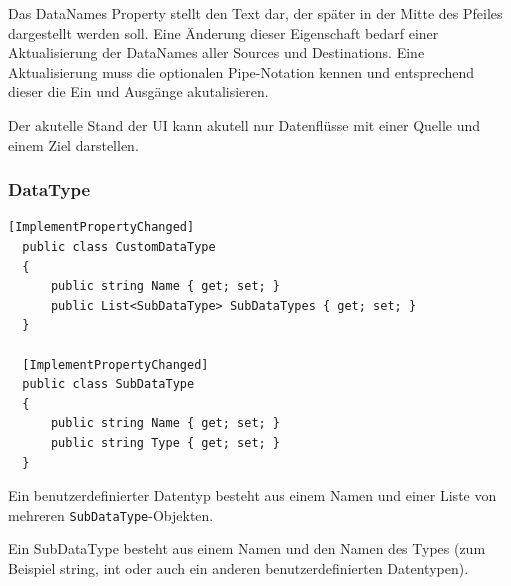 \documentclass[11pt]{article}
\begin{document}
Das DataNames Property stellt den Text dar, der später in der Mitte des
Pfeiles dargestellt werden soll. Eine Änderung dieser Eigenschaft bedarf
einer Aktualisierung der DataNames aller Sources und Destinations.
Eine Aktualisierung muss die optionalen Pipe-Notation kennen und
entsprechend dieser die Ein und Ausgänge akutalisieren.

Der akutelle Stand der UI kann akutell nur Datenflüsse mit einer Quelle und
einem Ziel darstellen.

\subsubsection{DataType}
\label{sec:orgheadline10}

\begin{verbatim}
[ImplementPropertyChanged]
  public class CustomDataType
  {
      public string Name { get; set; }
      public List<SubDataType> SubDataTypes { get; set; }
  }

  [ImplementPropertyChanged]
  public class SubDataType
  {
      public string Name { get; set; }
      public string Type { get; set; }
  }
\end{verbatim}

Ein benutzerdefinierter Datentyp besteht aus einem Namen und einer Liste von mehreren
\texttt{SubDataType}-Objekten. 

Ein SubDataType besteht aus einem Namen und den Namen
des Types (zum Beispiel string, int oder auch ein anderen benutzerdefinierten
Datentypen).
\end{document}
